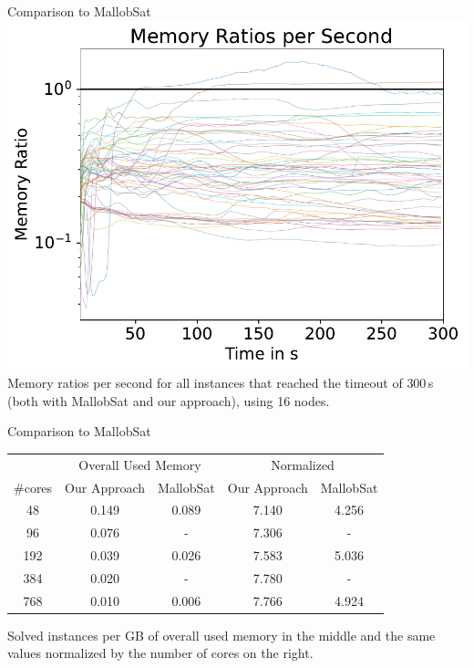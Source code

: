 \documentclass[]{sdqbeamer}
\begin{document}
\begin{frame}{Comparison to MallobSat}
    \center
    \includegraphics[scale=.8]{plots/16node_compare/mem_ratio_per_second.pdf}\\
    Memory ratios per second for all instances that reached the timeout of $300\,$s (both with MallobSat and our approach), using 16 nodes. %
\end{frame}

\begin{frame}{Comparison to MallobSat}
    \center
    \begin{table}[scale=.75]
        \center
        \begin{tabular}{ ccccc }
          \toprule
          \multicolumn{1}{c}{} & \multicolumn{2}{c}{Overall Used Memory} & \multicolumn{2}{c}{Normalized}\\
          \#cores & Our Approach & MallobSat & Our Approach & MallobSat \\
          \midrule
          48  & 0.149 & 0.089 & 7.140 & 4.256\\
          96  & 0.076 & -     & 7.306 & -\\
          192 & 0.039 & 0.026 & 7.583 & 5.036\\
          384 & 0.020 & -     & 7.780 & -\\
          768 & 0.010 & 0.006 & 7.766 & 4.924\\
          \bottomrule
        \end{tabular}
    \end{table}
    \vfill
    Solved instances per GB of overall used memory in the middle and the same values normalized by the number of cores on the right.
\end{frame}
\end{document}
